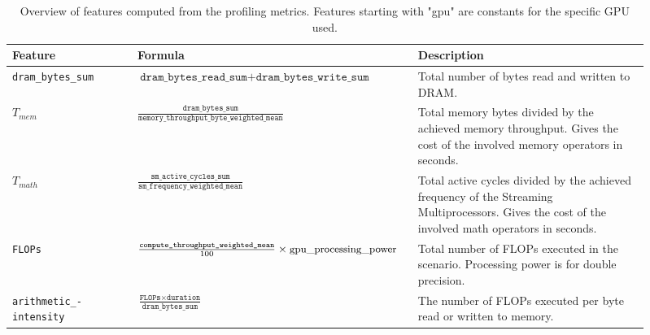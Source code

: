 \begin{table}[ht]
    \centering
    \begin{tabular}{p{0.19\linewidth}p{0.37\linewidth}>{\footnotesize}p{0.35\linewidth}}
        \toprule
        Feature                                   & Formula                                                                                                 & Description                                                                                                                                       \\
        \midrule\midrule
        \texttt{dram\_bytes\_sum}                 & $\texttt{dram\_bytes\_read\_sum} + \texttt{dram\_bytes\_write\_sum}$                                    & Total number of bytes read and written to DRAM.                                                                                                   \\
        $T_{mem}$                                 & $\frac{\texttt{dram\_bytes\_sum}}{\texttt{memory\_throughput\_byte\_weighted\_mean}}$                   & Total memory bytes divided by the achieved memory throughput. Gives the cost of the involved memory operators in seconds.                         \\
        $T_{math}$                                & $\frac{\texttt{sm\_active\_cycles\_sum}}{\texttt{sm\_frequency\_weighted\_mean}}$                       & Total active cycles divided by the achieved frequency of the Streaming Multiprocessors. Gives the cost of the involved math operators in seconds. \\
        \texttt{FLOPs}                            & $\frac{\texttt{compute\_throughput\_weighted\_mean}}{100} \times \text{\small{gpu\_processing\_power}}$ & Total number of FLOPs executed in the scenario. Processing power is for double precision.                                                         \\
        \texttt{arithmetic\_-} \texttt{intensity} & $\frac{\texttt{FLOPs} \times \texttt{duration}}{\texttt{dram\_bytes\_sum}}$                             & The number of FLOPs executed per byte read or written to memory.                                                                                  \\

        \bottomrule
    \end{tabular}
    \caption[Derived features]{Overview of features computed from the profiling metrics. Features starting with "gpu" are constants for the specific GPU used.}
    \label{tab:5-derived-features}
\end{table}

